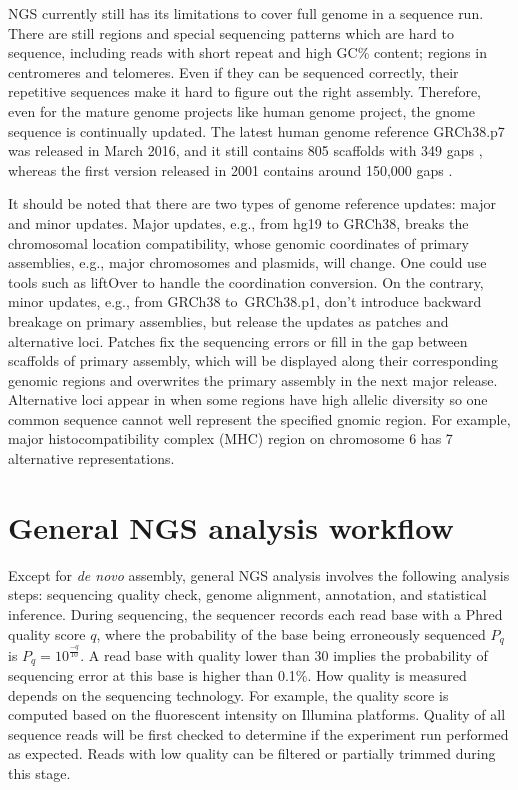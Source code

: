 
NGS currently still has its limitations to cover full genome in a sequence run.
There are still regions and special sequencing patterns which are hard to
sequence, including reads with short repeat and high GC\% content; regions in
centromeres and telomeres. Even if they can be sequenced correctly, their
repetitive sequences make it hard to figure out the right assembly. Therefore,
even for the mature genome projects like human genome project, the gnome
sequence is continually updated. The latest human genome reference GRCh38.p7
was released in March 2016, and it still contains 805 scaffolds with 349 gaps
\cite{:grch38p7}, whereas the first version released in 2001 contains around
150,000 gaps \cite{2010:e-pluribus-unum}.


It should be noted that there are two types of genome reference updates: major
and minor updates. Major updates, e.g., from hg19 to GRCh38, breaks the
chromosomal location compatibility, whose genomic coordinates of primary
assemblies, e.g., major chromosomes and plasmids, will change. One could use
tools such as liftOver to handle the coordination conversion. On the contrary,
minor updates, e.g., from GRCh38 to GRCh38.p1, don't introduce backward
breakage on primary assemblies, but release the updates as patches and
alternative loci. Patches fix the sequencing errors or fill in the gap between
scaffolds of primary assembly, which will be displayed along their
corresponding genomic regions and overwrites the primary assembly in the next
major release. Alternative loci appear in when some regions have high allelic
diversity so one common sequence cannot well represent the specified gnomic
region. For example, major histocompatibility complex (MHC) region on
chromosome 6 has 7 alternative representations.


%
%

\section{General NGS analysis workflow}

Except for \textit{de novo} assembly, general NGS analysis involves the
following analysis steps: sequencing quality check, genome alignment,
annotation, and statistical inference. During sequencing, the sequencer records
each read base with a Phred quality score $q$, where the probability of the
base being erroneously sequenced $P_q$ is $P_q = 10^{\frac{-q}{10}}$. A read
base with quality lower than 30 implies the probability of sequencing error at
this base is higher than 0.1\%. How quality is measured depends on the
sequencing technology. For example, the quality score is computed based on the
fluorescent intensity on Illumina platforms. Quality of all sequence reads will
be first checked to determine if the experiment run performed as expected.
Reads with low quality can be filtered or partially trimmed during this stage.

